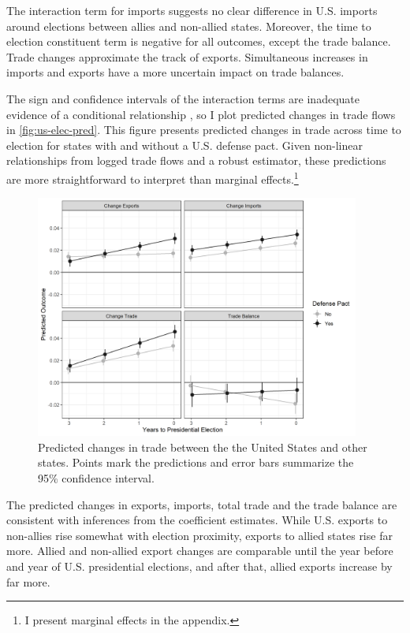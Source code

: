 \documentclass[12pt]{article}
\begin{document}
The interaction term for imports suggests no clear difference in U.S. imports around elections between allies and non-allied states. 
Moreover, the time to election constituent term is negative for all outcomes, except the trade balance. 
Trade changes approximate the track of exports. 
Simultaneous increases in imports and exports have a more uncertain impact on trade balances.
 


The sign and confidence intervals of the interaction terms are inadequate evidence of a conditional relationship \citep{BramborClarkGolder2006}, so I plot predicted changes in trade flows in \autoref{fig:us-elec-pred}.
This figure presents predicted changes in trade across time to election for states with and without a U.S. defense pact. 
Given non-linear relationships from logged trade flows and a robust estimator, these predictions are more straightforward to interpret than marginal effects.\footnote{I present marginal effects in the appendix.} 


\begin{figure}[htpb]
	\centering
		\includegraphics[width=0.95\textwidth]{../figures/us-elec-pred.png}
	\caption{Predicted changes in trade between the the United States and other states. Points mark the predictions and error bars summarize the 95\% confidence interval.}
	\label{fig:us-elec-pred}
\end{figure}


The predicted changes in exports, imports, total trade and the trade balance are consistent with inferences from the coefficient estimates. 
While U.S. exports to non-allies rise somewhat with election proximity, exports to allied states rise far more. 
Allied and non-allied export changes are comparable until the year before and year of U.S. presidential elections, and after that, allied exports increase by far more. 
\end{document}
